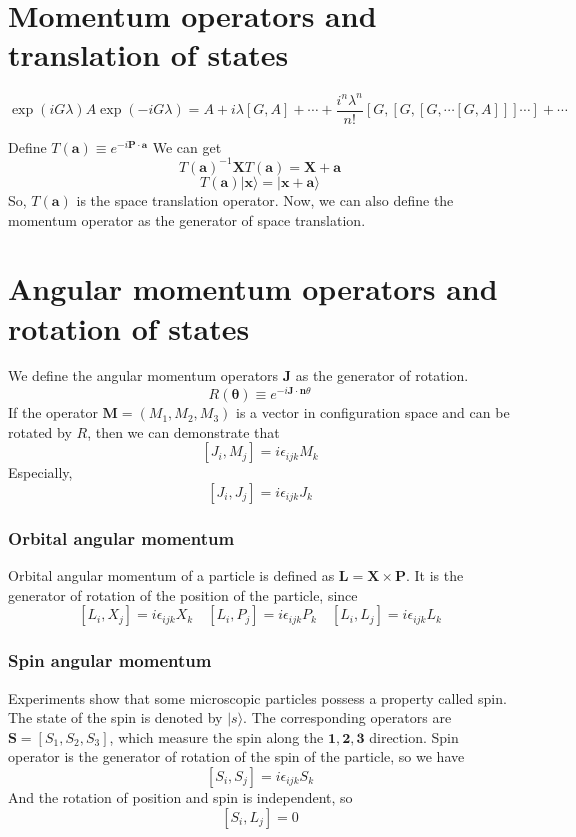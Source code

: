 \section{Momentum operators and translation of states}
\begin{newthem}
\[\exp(iG\lambda) A \exp(-iG\lambda) = A + i\lambda[G,A] + \cdots + \frac{i^n\lambda^n}{n!}[G,[G,[G,\cdots[G,A]]]\cdots]+\cdots\]
\end{newthem}
\noindent
Define $T(\bm{a}) \equiv e^{-i\bm{P \cdot a}}$
We can get
\[T(\bm{a})^{-1} \bm{X} T(\bm{a}) = \bm{X} + \bm{a}\]
\[T(\bm{a})|\bm{x}\rangle = |\bm{x}+\bm{a}\rangle\]
So, $T(\bm{a})$ is the space translation operator. 
Now, we can also define the momentum operator as the generator of space translation.

\section{Angular momentum operators and rotation of states}
\noindent
We define the angular momentum operators $\bm{J}$ as the generator of rotation.
\[R(\bm{\theta}) \equiv e^{-i\bm{J} \cdot \bm{n} \theta}\]
If the operator $\bm{M} = (M_1,M_2,M_3)$ is a vector in configuration space and can be rotated by $R$, then we can demonstrate that
\[[J_{i},M_{j}] = i \epsilon_{ijk}M_k\]
Especially, 
\[[J_i,J_j] = i\epsilon_{ijk}J_k\]

\subsubsection{Orbital angular momentum}
\noindent
Orbital angular momentum of a particle is defined as $\bm{L} = \bm{X} \times \bm{P}$. It is the generator of rotation of the position of the particle, since
\[[L_i,X_j] = i\epsilon_{ijk}X_k \quad [L_i,P_j] = i\epsilon_{ijk}P_k \quad [L_i,L_j] = i\epsilon_{ijk}L_k\]

\subsubsection{Spin angular momentum}
\noindent
Experiments show that some microscopic particles possess a property called spin. The state of the spin is denoted by $|s\rangle$. The corresponding operators are $\bm{S} = [S_1,S_2,S_3]$, which measure the spin along the $\bm{1},\bm{2},\bm{3}$ direction. Spin operator is the generator of rotation of the spin of the particle, so we have
\[[S_i,S_j]=i\epsilon_{ijk}S_k\]
And the rotation of position and spin is independent, so
\[[S_i,L_j] = 0\]

